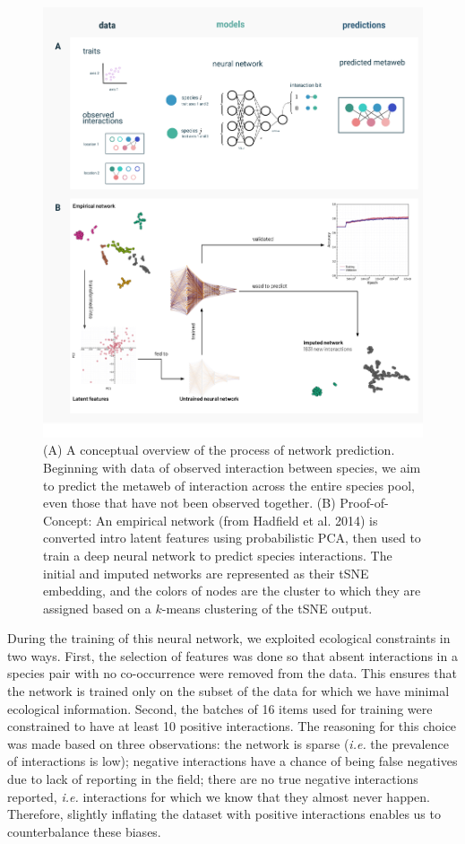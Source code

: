 \documentclass[10pt,oneside]{article}
\makeatletter
\def\maxwidth{\ifdim\Gin@nat@width>\linewidth\linewidth
\else\Gin@nat@width\fi}
\let\Oldincludegraphics\includegraphics
\renewcommand{\includegraphics}[1]{\Oldincludegraphics[width=\maxwidth]{#1}}
\makeatother
\begin{document}
\begin{figure}
\hypertarget{fig:example}{%
\centering
\includegraphics{figures/example_network_prediction.png}
\caption{(A) A conceptual overview of the process of network prediction.
Beginning with data of observed interaction between species, we aim to
predict the metaweb of interaction across the entire species pool, even
those that have not been observed together. (B) Proof-of-Concept: An
empirical network (from Hadfield et al. 2014) is converted intro latent
features using probabilistic PCA, then used to train a deep neural
network to predict species interactions. The initial and imputed
networks are represented as their tSNE embedding, and the colors of
nodes are the cluster to which they are assigned based on a \(k\)-means
clustering of the tSNE output.}\label{fig:example}
}
\end{figure}

During the training of this neural network, we exploited ecological
constraints in two ways. First, the selection of features was done so
that absent interactions in a species pair with no co-occurrence were
removed from the data. This ensures that the network is trained only on
the subset of the data for which we have minimal ecological information.
Second, the batches of 16 items used for training were constrained to
have at least 10 positive interactions. The reasoning for this choice
was made based on three observations: the network is sparse (\emph{i.e.}
the prevalence of interactions is low); negative interactions have a
chance of being false negatives due to lack of reporting in the field;
there are no true negative interactions reported, \emph{i.e.}
interactions for which we know that they almost never happen. Therefore,
slightly inflating the dataset with positive interactions enables us to
counterbalance these biases.
\end{document}
